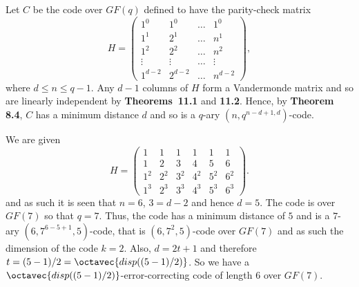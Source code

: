 Let $C$ be the code over $GF(q)$ defined to have the parity-check matrix
\[
H=
\begin{pmatrix}
1^0 & 1^0 & \ldots & 1^0 \\ 
1^1 & 2^1 & \ldots & n^1 \\ 
1^2 & 2^2 & \ldots & n^2 \\ 
\vdots & \vdots & \ldots & \vdots \\ 
1^{d-2} & 2^{d-2} & \ldots & n^{d-2}
\end{pmatrix},
\]
where $d \leq n \leq q-1$. Any $d-1$ columns of $H$ form a Vandermonde matrix and so are linearly independent by \textbf{Theorems~11.1} and \textbf{11.2}. Hence, by \textbf{Theorem 8.4}, $C$ has a minimum distance $d$ and so is a $q$-ary $(n, q^{n-d+1, d})$-code.

We are given 
\[
H=
\begin{pmatrix}
1 & 1 & 1 & 1 & 1 & 1 \\ 
1 & 2 & 3 & 4 & 5 & 6 \\ 
1^2 & 2^2 & 3^2 & 4^2 & 5^2 & 6^2 \\ 
1^3 & 2^3 & 3^3 & 4^3 & 5^3 & 6^3
\end{pmatrix}.
\]
and as such it is seen that $n=6$, $3 = d - 2$ and hence $d=5$. The code is over $GF(7)$ so that $q=7$. Thus, the code has a minimum distance of $5$ and is a $7$-ary $(6, 7^{6-5+1},5)$-code, that is $(6, 7^2,5)$-code over $GF(7)$ and as such the dimension of the code $k=2$. Also, $d = 2t + 1$ and therefore $t=(5 - 1)/2 =\octavec{disp((5-1)/2)}$. So we have a  $\octavec{disp((5-1)/2)}$-error-correcting code of length $6$ over $GF(7)$. 